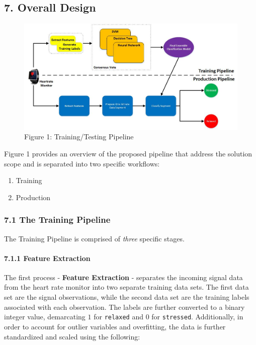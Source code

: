 \documentclass{scrreprt}
\makeatletter
\def\maxwidth{\ifdim\Gin@nat@width>\linewidth\linewidth
    \else\Gin@nat@width\fi}
\let\Oldincludegraphics\includegraphics
\renewcommand{\includegraphics}[1]{\Oldincludegraphics[width=.8\maxwidth]{#1}}
\makeatother
\begin{document}
\subsection{7. Overall Design}\label{overall-design}

\begin{figure}[htbp]
\centering
\includegraphics{images/Pipeline.jpg}
\caption{Figure 1: Training/Testing Pipeline}
\end{figure}

Figure 1 provides an overview of the proposed pipeline that address the
solution scope and is separated into two specific workflows:

\begin{enumerate}
\def\labelenumi{\arabic{enumi}.}
\itemsep1pt\parskip0pt
\item
  Training
\item
  Production
\end{enumerate}

\subsubsection{7.1 The Training Pipeline}\label{the-training-pipeline}

The Training Pipeline is comprised of \emph{three} specific stages.

\paragraph{7.1.1 Feature Extraction}\label{feature-extraction}

The first process - \textbf{Feature Extraction} - separates the incoming
signal data from the heart rate monitor into two separate training data
sets. The first data set are the signal observations, while the second
data set are the training labels associated with each observation. The
labels are further converted to a binary integer value, demarcating $1$
for \texttt{relaxed} and $0$ for \texttt{stressed}. Additionally, in
order to account for outlier variables and overfitting, the data is
further standardized and scaled using the following:
\end{document}
